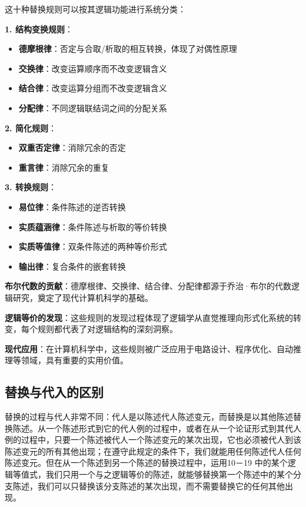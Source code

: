 \begin{theorembox}[title=十种替换规则的分类与特征]
这十种替换规则可以按其逻辑功能进行系统分类：

\textbf{1. 结构变换规则}：
\begin{itemize}
\item \textbf{德摩根律}：否定与合取/析取的相互转换，体现了对偶性原理
\item \textbf{交换律}：改变运算顺序而不改变逻辑含义
\item \textbf{结合律}：改变运算分组而不改变逻辑含义
\item \textbf{分配律}：不同逻辑联结词之间的分配关系
\end{itemize}

\textbf{2. 简化规则}：
\begin{itemize}
\item \textbf{双重否定律}：消除冗余的否定
\item \textbf{重言律}：消除冗余的重复
\end{itemize}

\textbf{3. 转换规则}：
\begin{itemize}
\item \textbf{易位律}：条件陈述的逆否转换
\item \textbf{实质蕴涵律}：条件陈述与析取的等价转换
\item \textbf{实质等值律}：双条件陈述的两种等价形式
\item \textbf{输出律}：复合条件的嵌套转换
\end{itemize}
\end{theorembox}

\begin{examplebox}[title=替换规则的历史意义]
\textbf{布尔代数的贡献}：德摩根律、交换律、结合律、分配律都源于乔治·布尔的代数逻辑研究，奠定了现代计算机科学的基础。

\textbf{逻辑等价的发现}：这些规则的发现过程体现了逻辑学从直觉推理向形式化系统的转变，每个规则都代表了对逻辑结构的深刻洞察。

\textbf{现代应用}：在计算机科学中，这些规则被广泛应用于电路设计、程序优化、自动推理等领域，具有重要的实用价值。
\end{examplebox}

\subsection{替换与代入的区别}

替换的过程与代人非常不同：代人是以陈述代人陈述变元，而替换是以其他陈述替换陈述。从一个陈述形式到它的代人例的过程中，或者在从一个论证形式到其代人例的过程中，只要一个陈述被代人一个陈述变元的某次出现，它也必须被代人到该陈述变元的所有其他出现；在遵守此规定的条件下，我们就能用任何陈述代人任何陈述变元。但在从一个陈述到另一个陈述的替换过程中，运用10－19 中的某个逻辑等值式，我们只用一个与之逻辑等价的陈述，就能够替换第一个陈述中的某个分支陈述，我们可以只替换该分支陈述的某次出现，而不需要替换它的任何其他出现。

